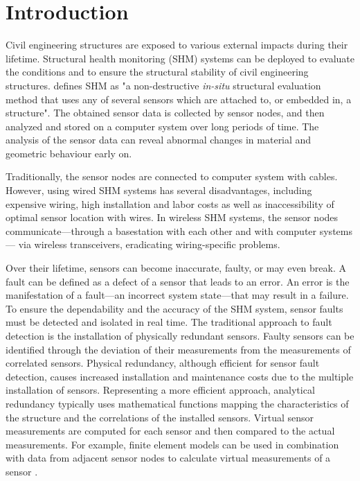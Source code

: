 \documentclass[12pt,a4paper]{scrartcl}
\begin{document}

\section*{Introduction}

Civil engineering structures are exposed to various external impacts during their lifetime. 
Structural health monitoring (SHM) systems can be deployed to evaluate the conditions and to ensure the structural stability of civil engineering structures.
\citet{BisbySHM} defines SHM as "a non-destructive \textit{in-situ} structural evaluation method that uses any of several sensors which are attached to, or embedded in, a structure".
The obtained sensor data is collected by sensor nodes, and then analyzed and stored on a computer system over long periods of time. 
The analysis of the sensor data can reveal abnormal changes in material and geometric behaviour early on.

Traditionally, the sensor nodes are connected to computer system with cables.
However, using wired SHM systems has several disadvantages, including expensive wiring, high installation and labor costs as well as inaccessibility of optimal sensor location with wires.
In wireless SHM systems, the sensor nodes communicate---through a basestation with each other and with computer systems--- via wireless transceivers, eradicating wiring-specific problems.

Over their lifetime, sensors can become inaccurate, faulty, or may even break.
A fault can be defined as a defect of a sensor that leads to an error. An error is the manifestation of a fault---an incorrect system state---that may result in a failure.
To ensure the dependability and the accuracy of the SHM system, sensor faults must be detected and isolated in real time. 
The traditional approach to fault detection is the installation of physically redundant sensors.
Faulty sensors can be identified through the deviation of their measurements from the measurements of correlated sensors.
Physical redundancy, although efficient for sensor fault detection, causes increased installation and maintenance costs due to the multiple installation of sensors. 
Representing a more efficient approach, analytical redundancy typically uses mathematical functions mapping the characteristics of the structure and the correlations of the installed sensors. Virtual sensor measurements are computed for each sensor and then compared to the actual measurements. 
For example, finite element models can be used in combination with data from adjacent sensor nodes to calculate virtual measurements of a sensor
\citep{Smarsly2014}.
\end{document}
